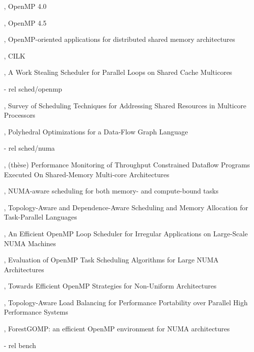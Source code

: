 


\cite{openmp40}, OpenMP 4.0

\cite{openmp45}, OpenMP 4.5

\cite{Marowka2004}, OpenMP-oriented applications for distributed shared memory architectures

\cite{cilk5}, CILK

\cite{Tchiboukdjian2010}, A Work Stealing Scheduler for Parallel Loops on Shared Cache Multicores

  - rel sched/openmp

\cite{Zhuravlev2012}, Survey of Scheduling Techniques for Addressing Shared Resources in Multicore Processors

\cite{Sbirlea2015}, Polyhedral Optimizations for a Data-Flow Graph Language

  - rel sched/numa

\cite{Selva2015}, (thèse) Performance Monitoring of Throughput Constrained Dataflow Programs Executed On Shared-Memory Multi-core Architectures

\cite{Reinman2015}, NUMA-aware scheduling for both memory- and compute-bound tasks

\cite{Drebes2014}, Topology-Aware and Dependence-Aware Scheduling and Memory Allocation for Task-Parallel Languages

\cite{Durand2013}, An Efficient OpenMP Loop Scheduler for Irregular Applications on Large-Scale NUMA Machines

\cite{Clet2014}, Evaluation of OpenMP Task Scheduling Algorithms for Large NUMA Architectures

\cite{Tahan2014}, Towards Efficient OpenMP Strategies for Non-Uniform Architectures

\cite{Pilla2014}, Topology-Aware Load Balancing for Performance Portability over Parallel High Performance Systems

\cite{Broquedis2010a}, ForestGOMP: an efficient OpenMP environment for NUMA architectures

  - rel bench

